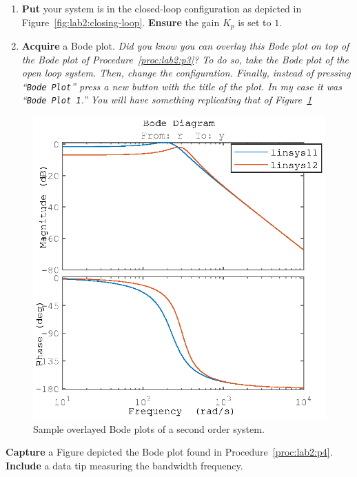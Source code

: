 %
\begin{procedure}[label={proc:lab2:p4}]
  \begin{enumerate}[label=(\arabic*)]
    \item{
      \textbf{Put} your system is in the closed-loop configuration as depicted
      in Figure~\ref{fig:lab2:closing-loop}.
      \textbf{Ensure} the gain \(K_p\) is set to \(1.\)
    }
    \item{
      \textbf{Acquire} a Bode plot. \emph{Did you know you can overlay
      this Bode plot on top of the Bode plot of Procedure~\ref{proc:lab2:p3}?
      To do so, take the Bode plot of the open loop system. Then, change the
      configuration. Finally, instead of pressing ``\texttt{Bode Plot}'' press
      a new button with the title of the plot. In my case it was
      ``\texttt{Bode Plot 1}.'' You will have something replicating that of
      Figure~\ref{fig:lab2:bodeclosed}}
    }
  \end{enumerate}
\end{procedure}
%
\begin{figure}
  \centering
  \includegraphics{images/Lab_2_Bode_ClosedLoop.eps}%
  \caption[Sample Overlayed Bode Plots of a Second Order System]{
    Sample overlayed Bode plots of a second order system.
  }
  \label{fig:lab2:bodeclosed}
\end{figure}
%
%
\begin{deliverable}[label={lab2:d3}]
  \textbf{Capture} a Figure depicted the Bode plot found in
  Procedure~\ref{proc:lab2:p4}. \textbf{Include} a data tip measuring
  the bandwidth frequency.
\end{deliverable}
%

